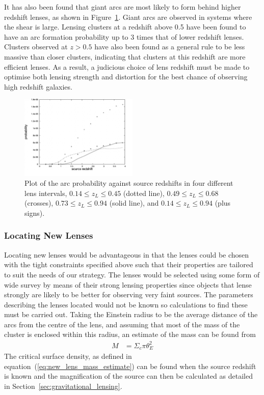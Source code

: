 		It has also been found that giant arcs are most likely to form behind higher redshift lenses, as shown in Figure~\ref{fig:Arc_probability}. Giant arcs are observed in systems where the shear is large. Lensing clusters at a redshift above 0.5 have been found to have an arc formation probability up to 3 times that of lower redshift lenses. Clusters observed at $z>0.5$ have also been found as a general rule to be less massive than closer clusters, indicating that clusters at this redshift are more efficient lenses. As a result, a judicious choice of lens redshift must be made to optimise both lensing strength and distortion for the best chance of observing high redshift galaxies\cite{wu_and_chiueh}.
		\begin{figure}[htbp]
			\centering
				\includegraphics[width=0.5\textwidth]{../Images/Arc_probability.png}
			\caption[Arc probability]{\cite{wu_and_chiueh}Plot of the arc probability against source redshifts in four different lens intervals, $0.14\le z_L\le 0.45$ (dotted line), $0.49\le z_L\le 0.68$ (crosses), $0.73\le z_L\le 0.94$ (solid line), and $0.14\le z_L\le 0.94$ (plus signs).\label{fig:Arc_probability}}
		\end{figure}

	\subsubsection{Locating New Lenses} %
	\label{sub:locating_new_lenses}
		Locating new lenses would be advantageous in that the lenses could be chosen with the tight constraints specified above such that their properties are tailored to suit the needs of our strategy. The lenses would be selected using some form of wide survey by means of their strong lensing properties since objects that lense strongly are likely to be better for observing very faint sources. The parameters describing the lenses located would not be known so calculations to find these must be carried out. Taking the Einstein radius to be the average distance of the arcs from the centre of the lens, and assuming that most of the mass of the cluster is enclosed within this radius, an estimate of the mass can be found from
		\begin{align}
			M &= \Sigma_c\pi \theta_E^2 \label{eq:new_lens_mass_estimate}
		\end{align}
		The critical surface density, as defined in equation~(\ref{eq:new_lens_mass_estimate}) can be found when the source redshift is known and the magnification of the source can then be calculated as detailed in Section~\ref{sec:gravitational_lensing}.

